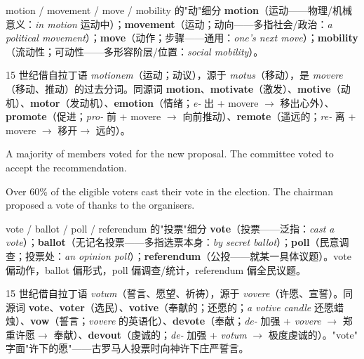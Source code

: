 \documentclass[../main.tex]{subfiles}
\begin{document}
\begin{gram}{motion / movement / move / mobility 的"动"细分}
\textbf{motion}（运动——物理/机械意义：\textit{in motion} 运动中）；\textbf{movement}（运动；动向——多指社会/政治：\textit{a political movement}）；\textbf{move}（动作；步骤——通用：\textit{one's next move}）；\textbf{mobility}（流动性；可动性——多形容阶层/位置：\textit{social mobility}）。
\end{gram}

\begin{origin}
15 世纪借自拉丁语 \textit{motionem}（运动；动议），源于 \textit{motus}（移动），是 \textit{movere}（移动、推动）的过去分词。同源词 \textbf{motion}、\textbf{motivate}（激发）、\textbf{motive}（动机）、\textbf{motor}（发动机）、\textbf{emotion}（情绪；\textit{e-} 出 + movere $\to$ 移出心外）、\textbf{promote}（促进；\textit{pro-} 前 + movere $\to$ 向前推动）、\textbf{remote}（遥远的；\textit{re-} 离 + movere $\to$ 移开$\to$ 远的）。
\end{origin}


{A majority of members voted for the new proposal.}
{The committee voted to accept the recommendation.}

{Over 60\% of the eligible voters cast their vote in the election.}
{The chairman proposed a vote of thanks to the organisers.}

\begin{gram}{vote / ballot / poll / referendum 的"投票"细分}
\textbf{vote}（投票——泛指：\textit{cast a vote}）；\textbf{ballot}（无记名投票——多指选票本身：\textit{by secret ballot}）；\textbf{poll}（民意调查；投票处：\textit{an opinion poll}）；\textbf{referendum}（公投——就某一具体议题）。vote 偏动作，ballot 偏形式，poll 偏调查/统计，referendum 偏全民议题。
\end{gram}

\begin{origin}
15 世纪借自拉丁语 \textit{votum}（誓言、愿望、祈祷），源于 \textit{vovere}（许愿、宣誓）。同源词 \textbf{vote}、\textbf{voter}（选民）、\textbf{votive}（奉献的；还愿的；\textit{a votive candle} 还愿蜡烛）、\textbf{vow}（誓言；\textit{vovere} 的英语化）、\textbf{devote}（奉献；\textit{de-} 加强 + \textit{vovere} $\to$ 郑重许愿$\to$ 奉献）、\textbf{devout}（虔诚的；\textit{de-} 加强 + \textit{votum} $\to$ 极度虔诚的）。"vote" 字面"许下的愿"——古罗马人投票时向神许下庄严誓言。
\end{origin}
\end{document}
